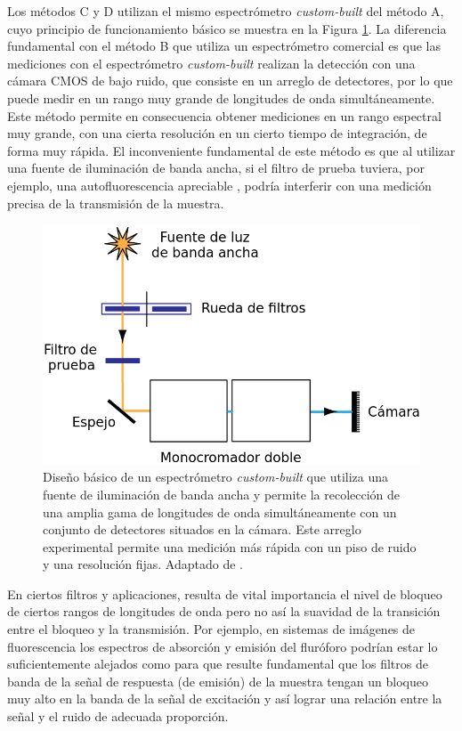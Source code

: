 \documentclass{ctuthesis}
\begin{document}
Los métodos C y D utilizan el mismo espectrómetro \textit{custom-built}	del 
método A, cuyo principio de funcionamiento básico se muestra en la Figura 
\ref{fig:med_prev}. La diferencia fundamental con el método B que utiliza un 
espectrómetro comercial es que las mediciones con el espectrómetro 
\textit{custom-built} realizan la detección con una cámara CMOS de bajo ruido, 
que consiste en un arreglo de detectores, por lo que puede medir en un rango 
muy grande de longitudes de onda simultáneamente. Este método permite en 
consecuencia obtener mediciones en un rango espectral muy grande, con una 
cierta resolución en un cierto tiempo de integración, de forma muy rápida.
El inconveniente fundamental de este método es que al utilizar una fuente de 
iluminación de banda ancha, si el filtro de prueba tuviera, por ejemplo, una 
autofluorescencia apreciable \cite{Shah2017}, podría interferir con una 
medición precisa de la transmisión de la muestra.


\begin{figure}[H]
	\centering
	\includegraphics[scale=0.8]{Figs/plan_de_tesis/med_mets_prevs.png}
	\caption{Diseño básico de un espectrómetro \textit{custom-built} que 
	utiliza una fuente de iluminación de banda ancha y permite la recolección 
	de una 		amplia gama de
		longitudes de onda simultáneamente con un conjunto de detectores 
		situados en la cámara. Este 
		arreglo experimental permite una medición más rápida con un piso de 
		ruido y una resolución fijas. Adaptado de 
		\cite{Semrock}.}
	\label{fig:med_prev}
\end{figure}








\hspace{0.5cm}En ciertos filtros y aplicaciones, resulta de vital importancia 
el 
nivel de bloqueo de ciertos rangos de longitudes de onda pero no así la 
suavidad de la transición entre el bloqueo y la transmisión. Por ejemplo, en 
sistemas de 
imágenes de fluorescencia los espectros de absorción y emisión del fluróforo 
podrían estar lo suficientemente alejados como para que resulte fundamental que 
los filtros de banda de la señal de respuesta (de emisión) de la muestra tengan 
un bloqueo muy alto en la banda de la señal de excitación y así lograr una 
relación entre la señal y el ruido de adecuada proporción. 
\end{document}
